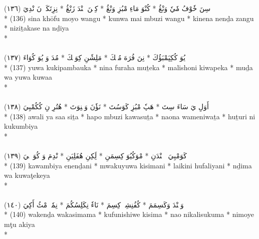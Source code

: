 \documentclass[a4paper, 12pt]{report}
\begin{document}
\begin{center}
\textarabic{(١٣٦) \textcolor{mygreen}{سِنَ خٗوْفُ مٗيٗ وَنْڠُ  * كُنْوَ مَاءِ مْبُزِ وَنْڠُ  * كِنٖنَ نٖنْدَ زَنْڠُ  * نِزِتَكَسٖ نَ نْدِيَ }} \\* 
(136) sina khōfu moyo wangu  * kunwa mai mbuzi wangu  * kinena nenḏa zangu  * niziṯakase na nḏiya  \\* 
 \\ 
\\[8mm] 

\textarabic{(١٣٧) \textcolor{mygreen}{يُوَ كُكِپَمْبَؤُكَ  * نِنَ فُرَهَ مُتٖكَ  * مَلِشٗنِ كِوَپٖكَ  * مُدَ وَ يُوَ كُوَاءَ }} \\* 
(137) yuwa kukipambauka  * nina furaha muṯeka  * malishoni kiwapeka  * muḏa wa yuwa kuwaa  \\* 
 \\ 
\\[8mm] 

\textarabic{(١٣٨) \textcolor{mygreen}{أَوَلِ يَ سَاءَ سِتَ  * هَپٗ مْبُزِ كَوَسُتَ  * نَؤٗنَ وَمٖنِوَتَ  * هُتُرِ نِ كُكُمْبِيَ }} \\* 
(138) awali ya saa siṯa  * hapo mbuzi kawasuṯa  * naona wameniwaṯa  * huṯuri ni kukumbiya  \\* 
 \\ 
\\[8mm] 

\textarabic{(١٣٩) \textcolor{mygreen}{كَوَمْبِيَ إٖنٖنْدَنِ  * مْوَكُيُوَ كِسِمَنِ  * لَِكِنِ هُفَلِيَنِ  * نْدِمَ وَ كُوَٹٖكٖيَ }} \\* 
(139) kawambiya enenḏani  * mwakuyuwa kisimani  * laikini hufaliyani  * nḏima wa kuwaţekeya  \\* 
 \\ 
\\[8mm] 

\textarabic{(١٤٠) \textcolor{mygreen}{وَكٖنْدَ وَكَسِمَمَ  * كُفُنِشِوٖ كِسِمَ  * نَاءٗ نِكَلِسُكُمَ  * نِمٗيٖ مْٹُ أَكِيَ }} \\* 
(140) wakenḏa wakasimama  * kufunishiwe kisima  * nao nikalisukuma  * nimoye mţu akiya  \\* 
 \\ 
\\[8mm] 


\end{center}
\end{document}
